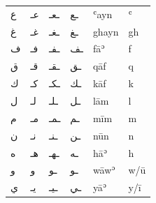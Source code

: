 \begin{table}[!htbp]
\begin{minipage}{\textwidth}
\begin{center}
\begin{tabularx}{\textwidth}{XXXXXp{2.6cm}}
\textarabic{ع} & \textarabic{عـ} & \textarabic{ـعـ} & \textarabic{ـع} & ʿayn & ʿ\\
\textarabic{غ} & \textarabic{غـ} & \textarabic{ـغـ} & \textarabic{ـغ} & ghayn & gh\\
\textarabic{ف} & \textarabic{فـ} & \textarabic{ـفـ} & \textarabic{ـف} & fāʾ & f\\
\textarabic{ق} & \textarabic{قـ} & \textarabic{ـقـ} & \textarabic{ـق} & qāf & q\\
\textarabic{ك} & \textarabic{كـ} & \textarabic{ـكـ} & \textarabic{ـك} & kāf & k\\
\textarabic{ل} & \textarabic{لـ} & \textarabic{ـلـ} & \textarabic{ـل} & lām & l\\
\textarabic{م} & \textarabic{مـ} & \textarabic{ـمـ} & \textarabic{ـم} & mīm & m\\
\textarabic{ن} & \textarabic{نـ} & \textarabic{ـنـ} & \textarabic{ـن} & nūn & n\\
\textarabic{ه} & \textarabic{هـ} & \textarabic{ـهـ} & \textarabic{ـه} & hāʾ & h\\
\textarabic{و} & \textarabic{و} & \textarabic{ـو} & \textarabic{ـو} & wāwʾ & w/ū\\
\textarabic{ي} & \textarabic{يـ} & \textarabic{ـيـ} & \textarabic{ـي} & yāʾ & y/ī\\
\bottomrule
\end{tabularx}
\end{center}
\renewcommand\footnoterule{}
\end{minipage}
\end{table}

